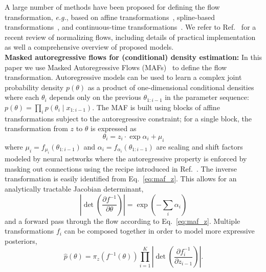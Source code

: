 \documentclass[prd,aps,10pt,nofootinbib,twocolumn,superscriptaddress,preprintnumbers,balancelastpage,longbibliography]{revtex4-1}
\begin{document}
A large number of methods have been proposed for defining the flow transformation, \emph{e.g.}, based on affine transformations~\cite{10.5555/3294771.3294994,kingma2016improved,dinh2016density,dinh2014nice}, spline-based transformations~\cite{durkan2019neural,durkan2019cubic}, and continuous-time transformations~\cite{grathwohl2018ffjord}. We refer to Ref.~\cite{papamakarios2019normalizing} for a recent review of normalizing flows, including details of practical implementation as well a comprehensive overview of proposed models. \\

\noindent
\textbf{Masked autoregressive flows for (conditional) density estimation:}
In this paper we use Masked Autoregressive Flows (MAFs)~\cite{10.5555/3294771.3294994} to define the flow transformation. Autoregressive models can be used to learn a complex joint probability density $p(\theta)$ as a product of one-dimensional conditional densities where each $\theta_i$ depends only on the previous $\theta_{1:i-1}$ in the parameter sequence: $p(\theta) = \prod_i p(\theta_i\mid x_{1:i-1})$. The MAF is built using blocks of affine transformations subject to the autoregressive constraint; for a single block, the transformation from $z$ to $\theta$ is expressed as 
\begin{equation}
\label{eq:maf_z}
\theta_{i}=z_{i}\cdot \exp \alpha_{i}+\mu_{i} 
\end{equation}
where $\mu_{i}=f_{\mu_{i}}\left({\theta}_{1: i-1}\right)$ and $\alpha_i = f_{\alpha_{i}}\left({\theta}_{1: i-1}\right)$ are scaling and shift factors modeled by neural networks where the autoregressive property is enforced by masking out connections using the recipe introduced in Ref.~\cite{germain2015made}. The inverse transformation is easily identified from Eq.~\eqref{eq:maf_z}. This allows for an analytically tractable Jacobian determinant,
\begin{equation}
\label{eq:det}
\left|\operatorname{det}\left(\frac{\partial f^{-1}}{\partial {\theta}}\right)\right|=\exp \left(-\sum_{i} \alpha_{i}\right)
\end{equation}
and a forward pass through the flow according to Eq.~\eqref{eq:maf_z}.
Multiple transformations $f_i$ can be composed together in order to model more expressive posteriors,
\begin{equation}
\hat{p}({\theta})=\pi_{z}\left(f^{-1}({\theta})\right) \prod_{i=1}^{K}\left|\operatorname{det}\left(\frac{\partial f_{i}^{-1}}{\partial {z}_{i-1}}\right)\right|.
\end{equation}
\end{document}
